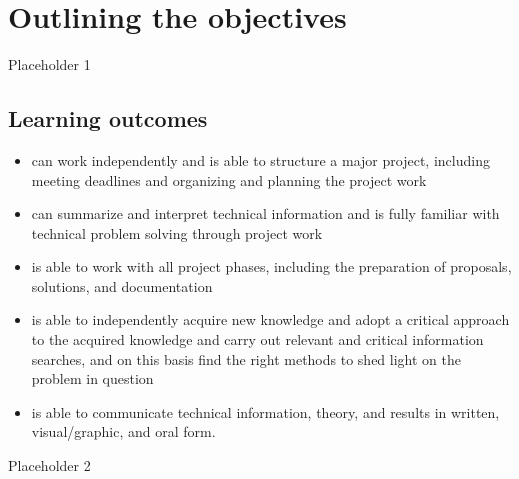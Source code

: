 \chapter{Outlining the objectives}

Placeholder 1 

\section{Learning outcomes}
\begin{itemize}
	\item can work independently and is able to structure a major project, including meeting deadlines and organizing and planning the project work
	\item can summarize and interpret technical information and is fully familiar with technical problem solving through project work
	\item is able to work with all project phases, including the preparation of proposals, solutions, and documentation
	\item is able to independently acquire new knowledge and adopt a critical approach to the acquired knowledge and carry out relevant and critical information searches, and on this basis find the right methods to shed light on the problem in question
	\item is able to communicate technical information, theory, and results in written, visual/graphic, and oral form.
\end{itemize}

Placeholder 2 